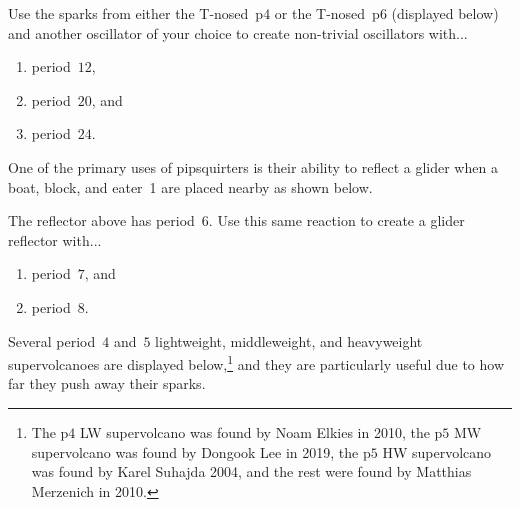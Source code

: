 \begin{multicols}{2}
	
	\mfilbreak
	
	
	\begin{problemstar}\label{exer:t_sparkers}
		Use the sparks from either the T-nosed~p$4$ or the T-nosed~p$6$ (displayed below) and another oscillator of your choice to create non-trivial oscillators with...
		
		\begin{center}
		\end{center}
		
		\begin{enumerate}[label=\bf\color{ocre}(\alph*)]
			\item period~$12$,
			
			\item period~$20$, and
			
			\item period~$24$.
		\end{enumerate}
	\end{problemstar}
	
	
	\mfilbreak
	
	
	\begin{problem}\label{exer:pipsquirter_reflectors}
		One of the primary uses of pipsquirters is their ability to reflect a glider when a boat, block, and eater~1 are placed nearby as shown below.
		
		\begin{center}
		\end{center}
		
		The reflector above has period~$6$. Use this same reaction to create a glider reflector with...\smallskip
		
		\begin{enumerate}[label=\bf\color{ocre}(\alph*)]
			\item period~$7$, and
			
			\item period~$8$.
		\end{enumerate}
	\end{problem}
	
	
	\mfilbreak
	
	
	\begin{problem}\label{exer:volcanoes}
		Several period~$4$ and~$5$ lightweight, middleweight, and heavyweight supervolcanoes are displayed below,\footnote{The p$4$ LW supervolcano was found by Noam Elkies in 2010, the p$5$ MW supervolcano was found by Dongook Lee in 2019, the p$5$ HW supervolcano was found by Karel Suhajda 2004, and the rest were found by Matthias Merzenich in 2010.} and they are particularly useful due to how far they push away their sparks.
		

\end{problem}
\end{multicols}
